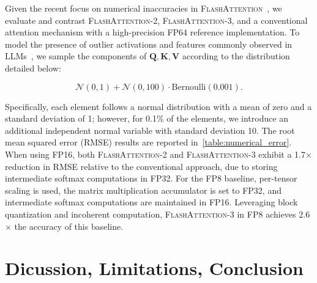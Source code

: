 Given the recent focus on numerical inaccuracies in \textsc{FlashAttention}~\citep{golden2024flash}, we evaluate and contrast \textsc{FlashAttention-2}, \textsc{FlashAttention-3}, and a conventional attention mechanism with a high-precision FP64 reference implementation. To model the presence of outlier activations and features commonly observed in LLMs~\citep{dettmers2208llm, sun2024massive}, we sample the components of $\mathbf{Q}, \mathbf{K}, \mathbf{V}$ according to the distribution detailed below:

\begin{equation*}
  \mathcal{N}(0, 1) + \mathcal{N}(0, 100) \cdot \mathrm{Bernoulli}(0.001).
\end{equation*}

Specifically, each element follows a normal distribution with a mean of zero and a standard deviation of 1; however, for 0.1\% of the elements, we introduce an additional independent normal variable with standard deviation 10. The root mean squared error (RMSE) results are reported in~\cref{table:numerical_error}. When using FP16, both \textsc{FlashAttention-2} and \textsc{FlashAttention-3} exhibit a 1.7$\times$ reduction in RMSE relative to the conventional approach, due to storing intermediate softmax computations in FP32. For the FP8 baseline, per-tensor scaling is used, the matrix multiplication accumulator is set to FP32, and intermediate softmax computations are maintained in FP16. Leveraging block quantization and incoherent computation, \textsc{FlashAttention-3} in FP8 achieves 2.6$\times$ the accuracy of this baseline.

\section{Dicussion, Limitations, Conclusion}
\label{sec:discussion}

